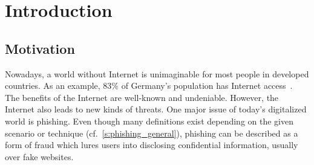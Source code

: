 \section{Introduction}
\label{s:introduction}

\subsection{Motivation}
Nowadays, a world without Internet is unimaginable for most people in developed countries.
As an example, 83\% of Germany's population has Internet access~\cite{globalfinance2012internetusage}. 
The benefits of the Internet are well-known and undeniable.
However, the Internet also leads to new kinds of threats.
One major issue of today's digitalized world is phishing. 
Even though many definitions exist depending on the given scenario or technique (cf.~\autoref{s:phishing_general}), phishing can be described as a form of fraud which lures users into disclosing confidential information, usually over fake websites.

